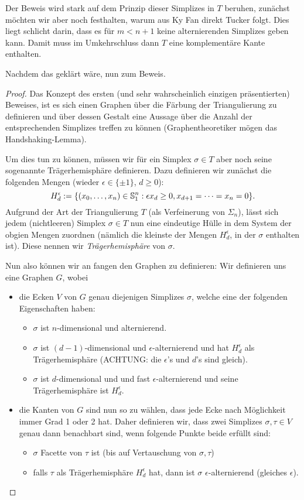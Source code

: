 \message{ !name(OnBorsukUlamsThoerem.tex)}\documentclass[10pt,a4paper]{article}
\begin{document}
Der Beweis wird stark auf dem Prinzip dieser Simplizes in $T$ beruhen, zunächst möchten wir aber noch festhalten, warum aus Ky Fan direkt Tucker folgt. Dies liegt schlicht darin, dass es für $m<n+1$ keine alternierenden Simplizes geben kann. Damit muss im Umkehrschluss dann $T$ eine komplementäre Kante enthalten.

Nachdem das geklärt wäre, nun zum Beweis.

\begin{proof}
Das Konzept des ersten (und sehr wahrscheinlich einzigen präsentierten) Beweises, ist es sich einen Graphen über die Färbung der Triangulierung zu definieren und über dessen Gestalt eine Aussage über die Anzahl der entsprechenden Simplizes treffen zu können (Graphentheoretiker mögen das Handshaking-Lemma).

Um dies tun zu können, müssen wir für ein Simplex $\sigma\in T$ aber noch seine sogenannte Trägerhemisphäre definieren.
Dazu definieren wir zunächst die folgenden Mengen (wieder $\epsilon\in\{\pm1\}$, $d\geq 0$):
\begin{equation}
H^{\epsilon}_d:=\{(x_0,\ldots,x_n)\in\mathbb{S}^n_1:\epsilon x_d\geq 0,x_{d+1}=\cdots=x_n=0\}\text{.} 
\end{equation}
Aufgrund der Art der Triangulierung $T$ (als Verfeinerung von $\Sigma_n$), lässt sich jedem (nichtleeren) Simplex $\sigma\in T$ nun eine eindeutige Hülle in dem System der obgien Mengen zuordnen (nämlich die kleinste der Mengen $H^{\epsilon}_d$, in der $\sigma$ enthalten ist). Diese nennen wir \emph{Trägerhemisphäre} von $\sigma$.

Nun also können wir an fangen den Graphen zu definieren: Wir definieren uns eine Graphen $G$, wobei
\begin{itemize}
\item die Ecken $V$ von $G$ genau diejenigen Simplizes $\sigma$, welche eine der folgenden Eigenschaften haben:
\begin{itemize}
\item $\sigma$ ist $n$-dimensional und alternierend. 
\item $\sigma$ ist $(d-1)$-dimensional und $\epsilon$-alternierend und hat $H^\epsilon_d$ als Trägerhemisphäre (ACHTUNG: die $\epsilon$'s und $d$'s sind gleich).
\item $\sigma$ ist $d$-dimensional und und fast $\epsilon$-alternierend und seine Trägerhemisphäre ist $H^\epsilon_d$.
\end{itemize}
\item die Kanten von $G$ sind nun so zu wählen, dass jede Ecke nach Möglichkeit immer Grad 1 oder 2 hat.
Daher definieren wir, dass zwei Simplizes $\sigma,\tau\in V$ genau dann benachbart sind, wenn folgende Punkte beide erfüllt sind:
\begin{itemize}
\item $\sigma$ Facette von $\tau$ ist (bis auf Vertauschung von $\sigma, \tau$)
\item falls $\tau$ als Trägerhemisphäre $H^\epsilon_d$ hat, dann ist $\sigma$ $\epsilon$-alternierend (gleiches $\epsilon$).
\end{itemize}
\end{itemize}


\end{proof}
\end{document}
